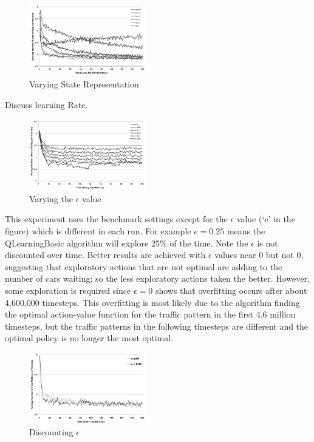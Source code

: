 \begin{description}
\begin{figure}
\centering
\includegraphics[width=0.45\textwidth]{states}
\caption{Varying State Representation}\label{f:states}
\end{figure}

\item[Fig.~\ref{f:states}]
Discuss learning Rate.

\begin{figure}
\centering
\includegraphics[width=0.45\textwidth]{epsilon}
\caption{Varying the $\epsilon $ value}\label{f:epsilon}
\end{figure}

\item[Fig.~\ref{f:epsilon}]
This experiment uses the benchmark settings except for the $\epsilon$
value (`e' in the figure) which is different in each run. For example $e = 0.25$ means
the QLearningBasic algorithm will explore 25\% of the time.
Note the $\epsilon$ is not discounted over time.
Better results are achieved with $\epsilon$ values near 0 but not 0,
suggesting that exploratory actions
that are not optimal are adding to the number of cars waiting; so
the less exploratory actions taken the better. However, some exploration
is required since $\epsilon =0$ shows that overfitting occurs after
about 4,600,000 timesteps. This overfitting is most likely due to
the algorithm finding the optimal action-value function for the traffic
pattern in the first 4.6 million timesteps, but the traffic patterns
in the following timesteps are different and the optimal policy is
no longer the most optimal.

\begin{figure}
\centering
\includegraphics[width=0.45\textwidth]{e-soft}
\caption{Discounting $\epsilon$}\label{f:e-soft}
\end{figure}


\end{description}
